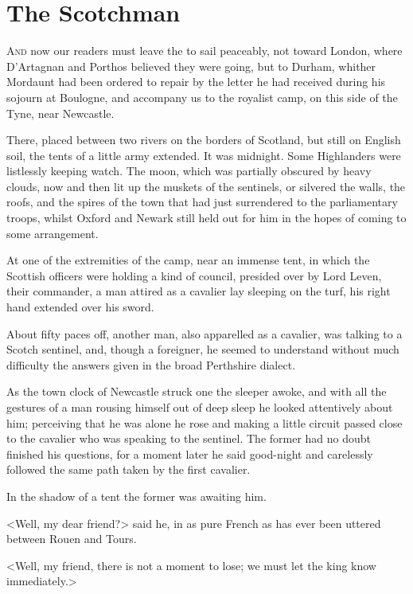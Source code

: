 \chapter{The Scotchman}

 \lettrine{A}{nd} now our readers must leave the  to sail peaceably, not toward London, where D'Artagnan and Porthos believed they were going, but to Durham, whither Mordaunt had been ordered to repair by the letter he had received during his sojourn at Boulogne, and accompany us to the royalist camp, on this side of the Tyne, near Newcastle.

There, placed between two rivers on the borders of Scotland, but still on English soil, the tents of a little army extended. It was midnight. Some Highlanders were listlessly keeping watch. The moon, which was partially obscured by heavy clouds, now and then lit up the muskets of the sentinels, or silvered the walls, the roofs, and the spires of the town that   had just surrendered to the parliamentary troops, whilst Oxford and Newark still held out for him in the hopes of coming to some arrangement.

At one of the extremities of the camp, near an immense tent, in which the Scottish officers were holding a kind of council, presided over by Lord Leven, their commander, a man attired as a cavalier lay sleeping on the turf, his right hand extended over his sword.

About fifty paces off, another man, also apparelled as a cavalier, was talking to a Scotch sentinel, and, though a foreigner, he seemed to understand without much difficulty the answers given in the broad Perthshire dialect.

As the town clock of Newcastle struck one the sleeper awoke, and with all the gestures of a man rousing himself out of deep sleep he looked attentively about him; perceiving that he was alone he rose and making a little circuit passed close to the cavalier who was speaking to the sentinel. The former had no doubt finished his questions, for a moment later he said good-night and carelessly followed the same path taken by the first cavalier.

In the shadow of a tent the former was awaiting him.

<Well, my dear friend?> said he, in as pure French as has ever been uttered between Rouen and Tours.

<Well, my friend, there is not a moment to lose; we must let the king know immediately.>

